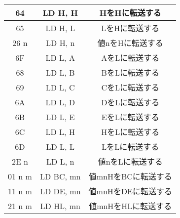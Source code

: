 \begin{center}
\begin{tabular}{|c|c|c|}
64& LD H, H & HをHに転送する  \\ \hline
65& LD H, L & LをHに転送する  \\ \hline
26 n& LD H, n & 値nをHに転送する  \\ \hline
6F& LD L, A & AをLに転送する  \\ \hline
68& LD L, B & BをLに転送する  \\ \hline
69& LD L, C & CをLに転送する  \\ \hline
6A& LD L, D & DをLに転送する  \\ \hline
6B& LD L, E & EをLに転送する  \\ \hline
6C& LD L, H & HをLに転送する  \\ \hline
6D& LD L, L & LをLに転送する  \\ \hline
2E n& LD L, n & 値nをLに転送する  \\ \hline
01 n m& LD BC, mn & 値mnHをBCに転送する  \\ \hline
11 n m& LD DE, mn & 値mnHをDEに転送する  \\ \hline
21 n m& LD HL, mn & 値mnHをHLに転送する  \\ \hline

\hline

\end{tabular}
\end{center}




\newpage



